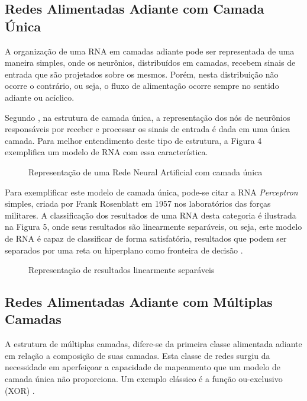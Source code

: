 \subsection{Redes Alimentadas Adiante com Camada Única}
A organização de uma RNA em camadas adiante pode ser representada de uma maneira simples, onde os neurônios, distribuídos em camadas, recebem sinais de entrada que são projetados sobre os mesmos. Porém, nesta distribuição não ocorre o contrário, ou seja, o fluxo de alimentação ocorre sempre no sentido adiante ou acíclico.
 
Segundo , na estrutura de camada única, a representação dos nós de neurônios responsáveis por receber e processar os sinais de entrada é dada em uma única camada. Para melhor entendimento deste tipo de estrutura, a Figura 4 exemplifica um modelo de RNA com essa característica.

\begin{figure}[h]
	\centering
	\caption{Representação de uma Rede Neural Artificial com camada única}
	\label{exec-rna-camada-unica}
\end{figure}

Para exemplificar este modelo de camada única, pode-se citar a RNA \textit{Perceptron} simples, criada por Frank Rosenblatt em 1957 nos laboratórios das forças militares. A classificação dos resultados de uma RNA desta categoria é ilustrada na Figura 5, onde seus resultados são linearmente separáveis, ou seja, este modelo de RNA é capaz de classificar de forma satisfatória, resultados que podem ser separados por uma reta ou hiperplano como fronteira de decisão \cite{haykin2009}.

\begin{figure}[h]
	\centering
	\caption{Representação de resultados linearmente separáveis}
	\label{exec-linearmente-separavel}
\end{figure}

\subsection{Redes Alimentadas Adiante com Múltiplas Camadas}
A estrutura de múltiplas camadas, difere-se da primeira classe alimentada adiante em relação a composição de suas camadas. Esta classe de redes surgiu da necessidade em aperfeiçoar a capacidade de mapeamento que um modelo de camada única não proporciona. Um exemplo clássico é a função ou-exclusivo (XOR) \cite{haykin2009}.

